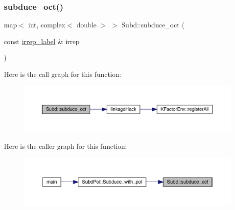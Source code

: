 \subsubsection{\texorpdfstring{subduce\_oct()}{subduce\_oct()}}
{\footnotesize\ttfamily map$<$ int, complex$<$ double $>$ $>$ Subd\+::subduce\+\_\+oct (\begin{DoxyParamCaption}\item[{const \mbox{\hyperlink{structirrep__label}{irrep\+\_\+label}} \&}]{irrep }\end{DoxyParamCaption})}

Here is the call graph for this function\+:
\nopagebreak
\begin{figure}[H]
\begin{center}
\leavevmode
\includegraphics[width=350pt]{d8/d2b/namespaceSubd_aa8b77162377de658856d44a4ac5aad26_cgraph}
\end{center}
\end{figure}
Here is the caller graph for this function\+:
\nopagebreak
\begin{figure}[H]
\begin{center}
\leavevmode
\includegraphics[width=350pt]{d8/d2b/namespaceSubd_aa8b77162377de658856d44a4ac5aad26_icgraph}
\end{center}
\end{figure}
